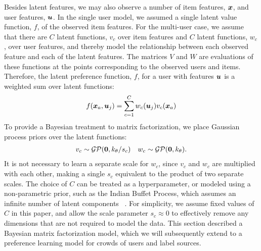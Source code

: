Besides latent features, we may also observe a number of item features, $\boldsymbol x$,
and user features, $\boldsymbol u$. 
In the single user model, we assumed a single latent value function, $f$, of the observed item features. 
For the multi-user case, we assume that there are $C$ latent functions, $v_c$ over 
item features and $C$ latent functions, $w_c$, over user features,
and thereby model the relationship between each observed feature and each of the latent features. 
The matrices $V$ and $W$ are evaluations of these functions at the points corresponding to 
the observed users and items.
Therefore, the latent preference function, $f$, for a user with features $\boldsymbol u$ is 
a weighted sum over latent functions:
\begin{align}
  f(\boldsymbol x_a, \boldsymbol u_j) = \sum_{c=1}^C w_c(\boldsymbol u_j) v_c(\boldsymbol x_a)
\end{align}
To provide a Bayesian treatment to matrix factorization, we place Gaussian process priors over the latent functions:
\begin{align}
v_c \sim \mathcal{GP}(\boldsymbol 0, k_{\theta} /s_c) & & w_c \sim \mathcal{GP}(\boldsymbol 0, k_{\theta}).
\end{align}
It is not necessary to learn a separate scale for $w_c$, since $v_c$ and $w_c$ are multiplied with each other, making a single $s_c$ equivalent to the product of two separate scales. 
The choice of $C$ can be treated as a hyperparameter, or modeled using a non-parametric prior, such as 
the Indian Buffet Process, which assumes an infinite number of latent components ~\citep{ding2010nonparametric}.
For simplicity, we assume fixed values of $C$ in this paper, and allow the scale parameter $s_c \approx 0$ 
to effectively remove any dimensions that are not required to model the data.
This section described a Bayesian matrix factorization model, 
which we will subsequently extend to a preference learning model for crowds of users and label sources. 

